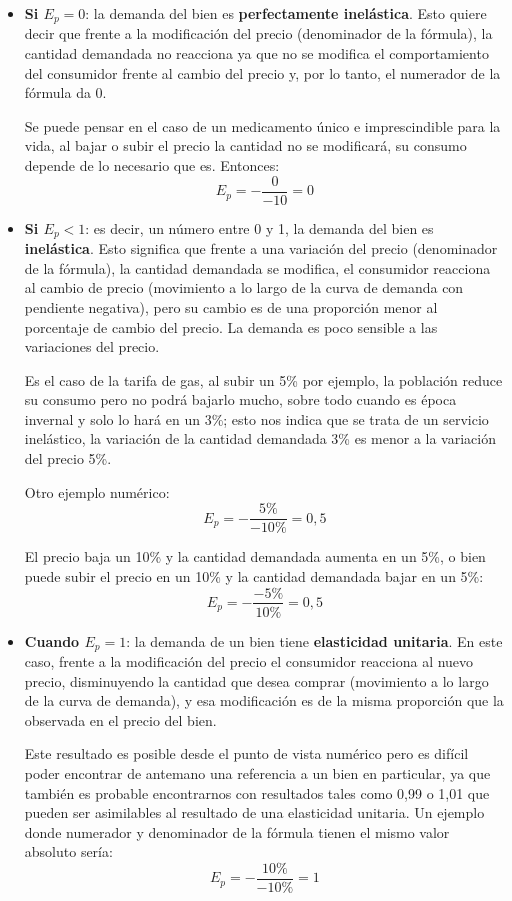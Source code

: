 \documentclass[12pt,a4paper]{article}
\begin{document}
\begin{itemize}
    \item \textbf{Si $E_p = 0$}: la demanda del bien es \textbf{perfectamente inelástica}. Esto quiere decir que frente a la modificación del precio (denominador de la fórmula), la cantidad demandada no reacciona ya que no se modifica el comportamiento del consumidor frente al cambio del precio y, por lo tanto, el numerador de la fórmula da 0.
    
    Se puede pensar en el caso de un medicamento único e imprescindible para la vida, al bajar o subir el precio la cantidad no se modificará, su consumo depende de lo necesario que es. Entonces:
    \[
    E_p = -\frac{0}{-10} = 0
    \]
    
    \item \textbf{Si $E_p < 1$}: es decir, un número entre 0 y 1, la demanda del bien es \textbf{inelástica}. Esto significa que frente a una variación del precio (denominador de la fórmula), la cantidad demandada se modifica, el consumidor reacciona al cambio de precio (movimiento a lo largo de la curva de demanda con pendiente negativa), pero su cambio es de una proporción menor al porcentaje de cambio del precio. La demanda es poco sensible a las variaciones del precio.
    
    Es el caso de la tarifa de gas, al subir un 5\% por ejemplo, la población reduce su consumo pero no podrá bajarlo mucho, sobre todo cuando es época invernal y solo lo hará en un 3\%; esto nos indica que se trata de un servicio inelástico, la variación de la cantidad demandada 3\% es menor a la variación del precio 5\%.
    
    Otro ejemplo numérico:
    \[
    E_p = -\frac{5\%}{-10\%} = 0,5
    \]
    
    El precio baja un 10\% y la cantidad demandada aumenta en un 5\%, o bien puede subir el precio en un 10\% y la cantidad demandada bajar en un 5\%:
    \[
    E_p = -\frac{-5\%}{10\%} = 0,5
    \]
    
    \item \textbf{Cuando $E_p = 1$}: la demanda de un bien tiene \textbf{elasticidad unitaria}. En este caso, frente a la modificación del precio el consumidor reacciona al nuevo precio, disminuyendo la cantidad que desea comprar (movimiento a lo largo de la curva de demanda), y esa modificación es de la misma proporción que la observada en el precio del bien.
    
    Este resultado es posible desde el punto de vista numérico pero es difícil poder encontrar de antemano una referencia a un bien en particular, ya que también es probable encontrarnos con resultados tales como 0,99 o 1,01 que pueden ser asimilables al resultado de una elasticidad unitaria. Un ejemplo donde numerador y denominador de la fórmula tienen el mismo valor absoluto sería:
    \[
    E_p = -\frac{10\%}{-10\%} = 1
    \]
    

\end{itemize}
\end{document}
